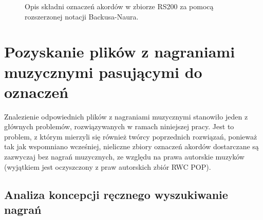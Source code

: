 \begin{figure}[tb]
    \centering
    {\scriptsize }
    \caption{Opis składni oznaczeń akordów w zbiorze RS200 za pomocą rozszerzonej notacji Backusa-Naura.}
    \label{fig:rs200_dt_syntax}
\end{figure}


\section{Pozyskanie plików z nagraniami muzycznymi pasującymi do oznaczeń}

Znalezienie odpowiednich plików z nagraniami muzycznymi stanowiło jeden z głównych problemów, rozwiązywanych w ramach niniejszej pracy. Jest to problem, z którym mierzyli się również twórcy poprzednich rozwiązań, ponieważ tak jak wspomniano wcześniej, nieliczne zbiory oznaczeń akordów dostarczane są zazwyczaj bez nagrań muzycznych, ze względu na prawa autorskie muzyków (wyjątkiem jest oczyszczony z praw autorskich zbiór RWC POP).

\subsection{Analiza koncepcji ręcznego wyszukiwanie nagrań}

